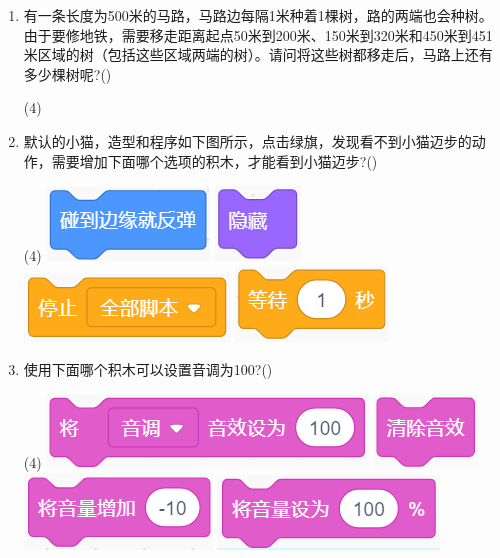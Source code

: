 \documentclass[10pt, a4paper]{article}
\begin{document}
\begin{enumerate}
        \item 有一条长度为500米的马路，马路边每隔1米种着1棵树，路的两端也会种树。由于要修地铁，需要移走距离起点50米到200米、150米到320米和450米到451米区域的树（包括这些区域两端的树）。请问将这些树都移走后，马路上还有多少棵树呢?(\qquad)
        \begin{tasks}(4)
        \end{tasks}
           
        \newpage
        \item 默认的小猫，造型和程序如下图所示，点击绿旗，发现看不到小猫迈步的动作，需要增加下面哪个选项的积木，才能看到小猫迈步?(\qquad)
        \begin{tasks}(4)
            \task \includegraphics[width=.12\textwidth]{8a.png}
            \task \includegraphics[width=.06\textwidth]{8b.png}
            \task \includegraphics[width=.15\textwidth]{8c.png}
            \task \includegraphics[width=.11\textwidth]{8d.png}
        \end{tasks}

        \item 使用下面哪个积木可以设置音调为100?(\qquad)
        \begin{tasks}(4)
            \task \includegraphics[width=.18\textwidth]{9a.png}
            \task \includegraphics[width=.07\textwidth]{9b.png}
            \task \includegraphics[width=.12\textwidth]{9c.png}
            \task \includegraphics[width=.15\textwidth]{9d.png}
        \end{tasks}


\end{enumerate}
\end{document}
